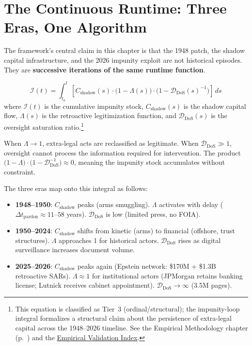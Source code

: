 \section{The Continuous Runtime: Three Eras, One Algorithm}

The framework's central claim in this chapter is that the 1948 patch, the shadow capital infrastructure, and the 2026 impunity exploit are not historical episodes. They are \textbf{successive iterations of the same runtime function}.

\begin{equation}\label{eq:gp13-impunity-loop}
\mathcal{I}(t) = \int_{t_0}^{t} \left[ C_{\text{shadow}}(s) \cdot \bigl(1 - \Lambda(s)\bigr) \cdot \bigl(1 - \mathcal{D}_{\text{DoS}}(s)^{-1}\bigr) \right] \, ds
\end{equation}
where $\mathcal{I}(t)$ is the cumulative impunity stock, $C_{\text{shadow}}(s)$ is the shadow capital flow, $\Lambda(s)$ is the retroactive legitimization function, and $\mathcal{D}_{\text{DoS}}(s)$ is the oversight saturation ratio.\footnote{This equation is classified as Tier~3 (ordinal/structural); the impunity-loop integral formalizes a structural claim about the persistence of extra-legal capital across the 1948--2026 timeline. See the Empirical Methodology chapter (p.~\pageref{ch:empirical_methodology}) and the \hyperref[app:empirical_index]{Empirical Validation Index}.}

When $\Lambda \rightarrow 1$, extra-legal acts are reclassified as legitimate. When $\mathcal{D}_{\text{DoS}} \gg 1$, oversight cannot process the information required for intervention. The product $\bigl(1 - \Lambda\bigr) \cdot \bigl(1 - \mathcal{D}_{\text{DoS}}^{-1}\bigr) \approx 0$, meaning the impunity stock accumulates without constraint.

The three eras map onto this integral as follows:

\begin{itemize}
    \item \textbf{1948--1950}: $C_{\text{shadow}}$ peaks (arms smuggling). $\Lambda$ activates with delay ($\Delta t_{\text{pardon}} \approx 11$--$58$ years). $\mathcal{D}_{\text{DoS}}$ is low (limited press, no FOIA).
    \item \textbf{1950--2024}: $C_{\text{shadow}}$ shifts from kinetic (arms) to financial (offshore, trust structures). $\Lambda$ approaches 1 for historical actors. $\mathcal{D}_{\text{DoS}}$ rises as digital surveillance increases document volume.
    \item \textbf{2025--2026}: $C_{\text{shadow}}$ peaks again (Epstein network: \$170M + \$1.3B retroactive SARs). $\Lambda \approx 1$ for institutional actors (JPMorgan retains banking license; Lutnick receives cabinet appointment). $\mathcal{D}_{\text{DoS}} \rightarrow \infty$ (3.5M pages).
\end{itemize}

